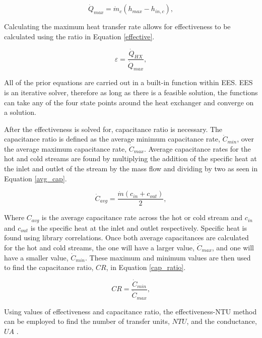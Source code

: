 \begin{paracol}{2}
\begin{equation}
    \label{heattrans_max}
    \dot{Q}_{max} = \dot{m}_{c}(h_{max}-h_{in,c}),
\end{equation}

Calculating the maximum heat transfer rate allows for effectiveness to be calculated using the ratio in Equation \ref{effective}.

\begin{equation}
    \label{effective}
    \varepsilon = \frac{\dot{Q}_{HX}}{\dot{Q}_{max}},
\end{equation}

All of the prior equations are carried out in a built-in function within EES. EES is an iterative solver, therefore as long as there is a feasible solution, the functions can take any of the four state points around the heat exchanger and converge on a solution.

After the effectiveness is solved for, capacitance ratio is necessary. The capacitance ratio is defined as the average minimum capacitance rate, $\dot{C}_{min}$, over the average maximum capacitance rate, $\dot{C}_{max}$. Average capacitance rates for the hot and cold streams are found by multiplying the addition of the specific heat at the inlet and outlet of the stream by the mass flow and dividing by two as seen in Equation \ref{avg_cap}.

\begin{equation}
    \label{avg_cap}
    \dot{C}_{avg} = \frac{\dot{m}(c_{in}+c_{out})}{2},
\end{equation}

Where $C_{avg}$ is the average capacitance rate across the hot or cold stream and $c_{in}$ and $c_{out}$ is the specific heat at the inlet and outlet respectively. Specific heat is found using library correlations. Once both average capacitances are calculated for the hot and cold streams, the one will have a larger value, $\dot{C}_{max}$, and one will have a smaller value,  $\dot{C}_{min}$. These maximum and minimum values are then used to find the capacitance ratio, $CR$, in Equation \ref{cap_ratio}.

\begin{equation}
    \label{cap_ratio}
    CR = \frac{\dot{C}_{min}}{\dot{C}_{max}},
\end{equation}

Using values of effectiveness and capacitance ratio, the effectiveness-NTU method can be employed to find the number of transfer units, $NTU$, and the conductance, $UA$ \cite{klein_nellis_2011,nellis_klein_2008}. 




\end{paracol}
